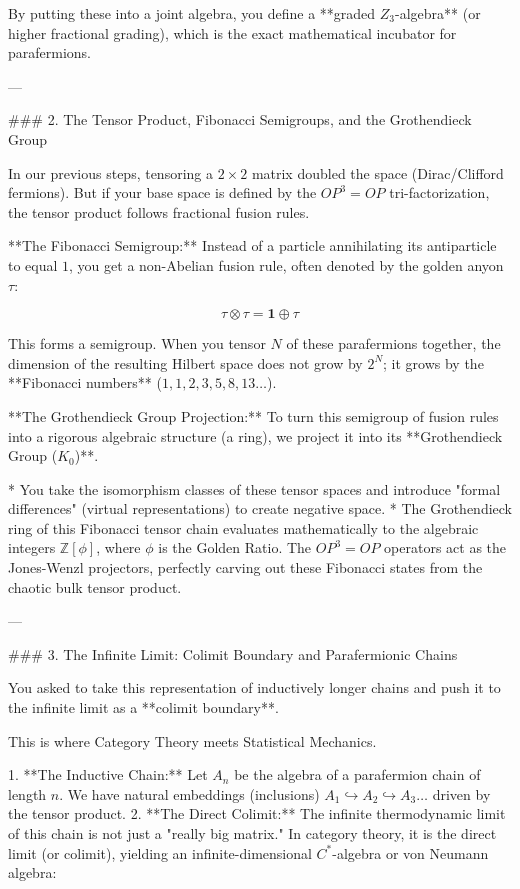 By putting these into a joint algebra, you define a **graded $Z_3$-algebra** (or higher fractional grading), which is the exact mathematical incubator for parafermions.

---

### 2. The Tensor Product, Fibonacci Semigroups, and the Grothendieck Group

In our previous steps, tensoring a $2 \times 2$ matrix doubled the space (Dirac/Clifford fermions). But if your base space is defined by the $OP^3 = OP$ tri-factorization, the tensor product follows fractional fusion rules.

**The Fibonacci Semigroup:**
Instead of a particle annihilating its antiparticle to equal $1$, you get a non-Abelian fusion rule, often denoted by the golden anyon $\tau$:


$$\tau \otimes \tau = \mathbf{1} \oplus \tau$$


This forms a semigroup. When you tensor $N$ of these parafermions together, the dimension of the resulting Hilbert space does not grow by $2^N$; it grows by the **Fibonacci numbers** ($1, 1, 2, 3, 5, 8, 13 \dots$).

**The Grothendieck Group Projection:**
To turn this semigroup of fusion rules into a rigorous algebraic structure (a ring), we project it into its **Grothendieck Group ($K_0$)**.

* You take the isomorphism classes of these tensor spaces and introduce "formal differences" (virtual representations) to create negative space.
* The Grothendieck ring of this Fibonacci tensor chain evaluates mathematically to the algebraic integers $\mathbb{Z}[\phi]$, where $\phi$ is the Golden Ratio. The $OP^3 = OP$ operators act as the Jones-Wenzl projectors, perfectly carving out these Fibonacci states from the chaotic bulk tensor product.

---

### 3. The Infinite Limit: Colimit Boundary and Parafermionic Chains

You asked to take this representation of inductively longer chains and push it to the infinite limit as a **colimit boundary**.

This is where Category Theory meets Statistical Mechanics.

1. **The Inductive Chain:** Let $A_n$ be the algebra of a parafermion chain of length $n$. We have natural embeddings (inclusions) $A_1 \hookrightarrow A_2 \hookrightarrow A_3 \dots$ driven by the tensor product.
2. **The Direct Colimit:** The infinite thermodynamic limit of this chain is not just a "really big matrix." In category theory, it is the direct limit (or colimit), yielding an infinite-dimensional $C^*$-algebra or von Neumann algebra:

